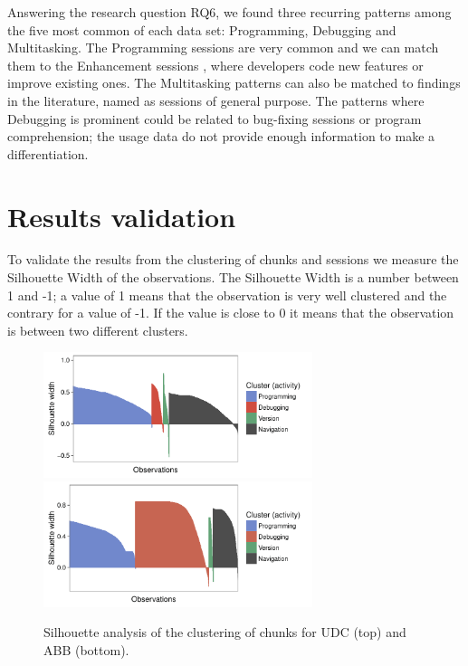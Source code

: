 \begin{changedforreviewerlong}


Answering the research question RQ6, we found three recurring patterns among the five most common of each data set: Programming, Debugging and Multitasking. The Programming sessions are very common and we can match them to the Enhancement sessions \cite{B14}, where developers code new features or improve existing ones. The Multitasking patterns can also be matched to findings in the literature, named as sessions of general purpose. The patterns where Debugging is prominent could be related to bug-fixing sessions or program comprehension; the usage data do not provide enough information to make a differentiation. 
\end{changedforreviewerlong}

\section{Results validation}
To validate the results from the clustering of chunks and sessions we measure the Silhouette Width of the observations. The Silhouette Width is a number between 1 and -1; a value of 1 means that the observation is very well clustered and the contrary for a value of -1. If the value is close to 0 it means that the observation is between two different clusters.

\begin{figure}[!ht]
	
	\centering		
	\includegraphics[width=0.7\textwidth]{Figures/UDC_silhouette_chunks}
	\includegraphics[width=0.7\textwidth]{Figures/ABB_silhouette_chunks}	
	\caption{Silhouette analysis of the clustering of chunks for UDC (top) and ABB (bottom).}
	\label{silhouette_chunks}
\end{figure}

